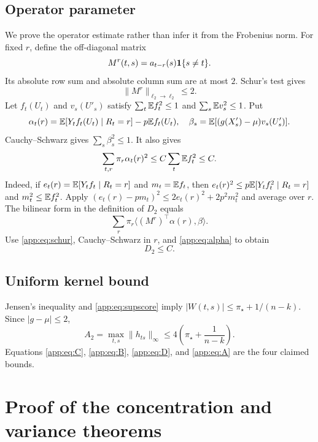 \subsection{Operator parameter}

We prove the operator estimate rather than infer it from the Frobenius norm. For fixed $r$, define the off-diagonal matrix
\[
 M^r(t,s)=a_{t-r}(s)\mathbf 1\{s\ne t\}.
\]
Its absolute row sum and absolute column sum are at most $2$. Schur's test gives
\begin{equation}
 \|M^r\|_{\ell_2\to\ell_2}\le2.
 \label{app:eq:schur}
\end{equation}
Let $f_t(U_t)$ and $v_s(U'_s)$ satisfy $\sum_t\mathbb E f_t^2\le1$ and $\sum_s\mathbb E v_s^2\le1$. Put
\[
 \alpha_t(r)=\mathbb E[Y_tf_t(U_t)\mid R_t=r]-p\mathbb E f_t(U_t),
 \quad
 \beta_s=\mathbb E[(g(X'_s)-\mu)v_s(U'_s)].
\]
Cauchy--Schwarz gives $\sum_s\beta_s^2\le1$. It also gives
\begin{equation}
 \sum_{t,r}\pi_r\alpha_t(r)^2\le C\sum_t\mathbb E f_t^2\le C.
 \label{app:eq:alpha}
\end{equation}
Indeed, if $e_t(r)=\mathbb E[Y_tf_t\mid R_t=r]$ and $m_t=\mathbb E f_t$, then
$e_t(r)^2\le p\mathbb E[Y_tf_t^2\mid R_t=r]$ and
$m_t^2\le\mathbb E f_t^2$. Apply $(e_t(r)-pm_t)^2\le
2e_t(r)^2+2p^2m_t^2$ and average over $r$.
The bilinear form in the definition of $D_2$ equals
\[
 \sum_r\pi_r\langle (M^r)^\top\alpha(r),\beta\rangle.
\]
Use \eqref{app:eq:schur}, Cauchy--Schwarz in $r$, and \eqref{app:eq:alpha} to obtain
\begin{equation}
 D_2\le C.
 \label{app:eq:D}
\end{equation}

\subsection{Uniform kernel bound}

Jensen's inequality and \eqref{app:eq:supscore} imply $|W(t,s)|\le\pi_\star+1/(n-k)$. Since $|g-\mu|\le2$,
\begin{equation}
 A_2=\max_{t,s}\|h_{ts}\|_\infty
 \le4\left(\pi_\star+\frac1{n-k}\right).
 \label{app:eq:A}
\end{equation}
Equations \eqref{app:eq:C}, \eqref{app:eq:B}, \eqref{app:eq:D}, and \eqref{app:eq:A} are the four claimed bounds.

\section{Proof of the concentration and variance theorems}

